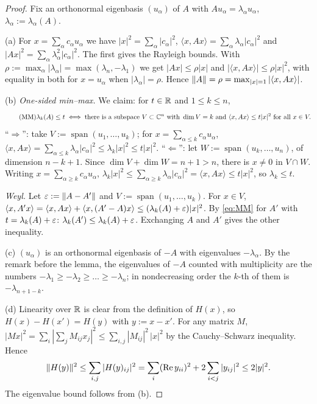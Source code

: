 \begin{proof}
Fix an orthonormal eigenbasis $(u_\alpha)$ of $A$ with $Au_\alpha=\lambda_\alpha u_\alpha$, $\lambda_\alpha:=\lambda_\alpha(A)$.

(a) For $x=\sum_\alpha c_\alpha u_\alpha$ we have $|x|^2=\sum_\alpha|c_\alpha|^2$, $\langle x,Ax\rangle=\sum_\alpha\lambda_\alpha|c_\alpha|^2$ and $|Ax|^2=\sum_\alpha\lambda_\alpha^2|c_\alpha|^2$.
The first gives the Rayleigh bounds. With $\rho:=\max_\alpha|\lambda_\alpha|=\max(\lambda_n,-\lambda_1)$ we get $|Ax|\le\rho|x|$ and $|\langle x,Ax\rangle|\le\rho|x|^2$, with equality in both for $x=u_\alpha$ when $|\lambda_\alpha|=\rho$.
Hence $\|A\|=\rho=\max_{|x|=1}|\langle x,Ax\rangle|$.

(b) \emph{One-sided min--max.} We claim: for $t\in\mathbb{R}$ and $1\le k\le n$,
\begin{equation}\tag{MM}\label{eq:MM}
 \lambda_k(A)\le t\iff\text{there is a subspace }V\subset\mathbb{C}^n\text{ with }\dim V=k\text{ and }\langle x,Ax\rangle\le t|x|^2\text{ for all }x\in V.
\end{equation}
``$\Rightarrow$'': take $V:=\operatorname{span}(u_1,\dots,u_k)$; for $x=\sum_{\alpha\le k}c_\alpha u_\alpha$, $\langle x,Ax\rangle=\sum_{\alpha\le k}\lambda_\alpha|c_\alpha|^2\le\lambda_k|x|^2\le t|x|^2$.
``$\Leftarrow$'': let $W:=\operatorname{span}(u_k,\dots,u_n)$, of dimension $n-k+1$. Since $\dim V+\dim W=n+1>n$, there is $x\ne0$ in $V\cap W$. Writing $x=\sum_{\alpha\ge k}c_\alpha u_\alpha$,
$\lambda_k|x|^2\le\sum_{\alpha\ge k}\lambda_\alpha|c_\alpha|^2=\langle x,Ax\rangle\le t|x|^2$, so $\lambda_k\le t$.

\emph{Weyl.} Let $\varepsilon:=\|A-A'\|$ and $V:=\operatorname{span}(u_1,\dots,u_k)$. For $x\in V$,
$\langle x,A'x\rangle=\langle x,Ax\rangle+\langle x,(A'-A)x\rangle\le(\lambda_k(A)+\varepsilon)|x|^2$. By \eqref{eq:MM} for $A'$ with $t=\lambda_k(A)+\varepsilon$: $\lambda_k(A')\le\lambda_k(A)+\varepsilon$. Exchanging $A$ and $A'$ gives the other inequality.

(c) $(u_\alpha)$ is an orthonormal eigenbasis of $-A$ with eigenvalues $-\lambda_\alpha$. By the remark before the lemma, the eigenvalues of $-A$ counted with multiplicity are the numbers $-\lambda_1\ge-\lambda_2\ge\dots\ge-\lambda_n$;
in nondecreasing order the $k$-th of them is $-\lambda_{n+1-k}$.

(d) Linearity over $\mathbb{R}$ is clear from the definition of $H(x)$, so $H(x)-H(x')=H(y)$ with $y:=x-x'$. For any matrix $M$, $|Mx|^2=\sum_i|\sum_jM_{ij}x_j|^2\le\sum_{i,j}|M_{ij}|^2\,|x|^2$ by the Cauchy--Schwarz inequality. Hence
\[
 \|H(y)\|^2\le\sum_{i,j}|H(y)_{ij}|^2=\sum_i(\operatorname{Re} y_{ii})^2+2\sum_{i<j}|y_{ij}|^2\le2|y|^2 .
\]
The eigenvalue bound follows from (b).


\end{proof}
